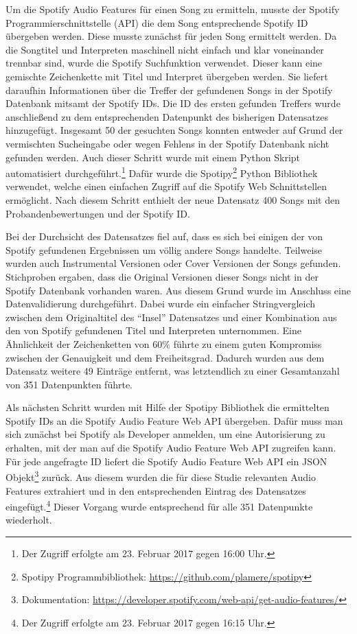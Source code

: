 Um die Spotify Audio Features für einen Song zu ermitteln, musste der Spotify Programmierschnittstelle (API) die dem Song entsprechende Spotify ID übergeben werden.
Diese musste zunächst für jeden Song ermittelt werden.
Da die Songtitel und Interpreten maschinell nicht einfach und klar voneinander trennbar sind, wurde die Spotify Suchfunktion verwendet.
Dieser kann eine gemischte Zeichenkette mit Titel und Interpret übergeben werden.
Sie liefert daraufhin Informationen über die Treffer der gefundenen Songs in der Spotify Datenbank mitsamt der Spotify IDs.
Die ID des ersten gefunden Treffers wurde anschließend zu dem entsprechenden Datenpunkt des bisherigen Datensatzes hinzugefügt.
Insgesamt 50 der gesuchten Songs konnten entweder auf Grund der vermischten Sucheingabe oder wegen Fehlens in der Spotify Datenbank nicht gefunden werden.
Auch dieser Schritt wurde mit einem Python Skript automatisiert durchgeführt.\footnote{Der Zugriff erfolgte am 23. Februar 2017 gegen 16:00 Uhr.}
Dafür wurde die Spotipy\footnote{Spotipy Programmbibliothek: \url{https://github.com/plamere/spotipy}} Python Bibliothek verwendet, welche einen einfachen Zugriff auf die Spotify Web Schnittstellen ermöglicht.
Nach diesem Schritt enthielt der neue Datensatz 400 Songs mit den Probandenbewertungen und der Spotify ID.

Bei der Durchsicht des Datensatzes fiel auf, dass es sich bei einigen der von Spotify gefundenen Ergebnissen um völlig andere Songs handelte.
Teilweise wurden auch Instrumental Versionen oder Cover Versionen der Songs gefunden.
Stichproben ergaben, dass die Original Versionen dieser Songs nicht in der Spotify Datenbank vorhanden waren.
Aus diesem Grund wurde im Anschluss eine Datenvalidierung durchgeführt.
Dabei wurde ein einfacher Stringvergleich zwischen dem Originaltitel des "`Insel"' Datensatzes und einer Kombination aus den von Spotify gefundenen Titel und Interpreten unternommen.
Eine Ähnlichkeit der Zeichenketten von 60\% führte zu einem guten Kompromiss zwischen der Genauigkeit und dem Freiheitsgrad.
Dadurch wurden aus dem Datensatz weitere 49 Einträge entfernt, was letztendlich zu einer Gesamtanzahl von 351 Datenpunkten führte.

Als nächsten Schritt wurden mit Hilfe der Spotipy Bibliothek die ermittelten Spotify IDs an die Spotify Audio Feature Web API  übergeben.
Dafür muss man sich zunächst bei Spotify als Developer anmelden, um eine Autorisierung zu erhalten, mit der man auf die Spotify Audio Feature Web API zugreifen kann.
Für jede angefragte ID liefert die Spotify Audio Feature Web API ein JSON Objekt\footnote{Dokumentation: \url{https://developer.spotify.com/web-api/get-audio-features/}} zurück.
Aus diesem wurden die für diese Studie relevanten Audio Features extrahiert und in den entsprechenden Eintrag des Datensatzes eingefügt.\footnote{Der Zugriff erfolgte am 23. Februar 2017 gegen 16:15 Uhr.}
Dieser Vorgang wurde entsprechend für alle 351 Datenpunkte wiederholt.

